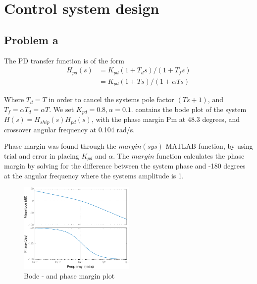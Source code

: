 \section{Control system design}

\subsection{Problem a}



The PD transfer function is of the form
\begin{align*}
    H_{pd}(s) &= K_{pd}(1+T_d s)/(1+T_f s) \\
              &= K_{pd}(1+T s)/(1+\alpha T s)
\end{align*}

Where $T_d = T$ in order to cancel the systems pole factor $(Ts + 1)$, and $T_f = \alpha T_d = \alpha T$. We set $K_{pd} = 0.8, \alpha = 0.1$.  contains the bode plot of the system $H(s) = H_{ship}(s)H_{pd}(s)$, with the phase margin Pm at 48.3 degrees, and crossover angular frequency at 0.104 rad/s.

Phase margin was found through the $margin(sys)$ MATLAB function, by using trial and error in placing $K_{pd}$ and $\alpha$. The $margin$ function calculates the phase margin by solving for the difference between the system phase and -180 degrees at the angular frequency where the systems amplitude is 1. 

\begin{figure}[ht]
    \centering
    \includegraphics[width=0.5\textwidth]{images/3a-bode_and_phasemargin}
    \caption{Bode - and phase margin plot}
    \label{fig:3a-bode_and_phasemargin}
\end{figure}

